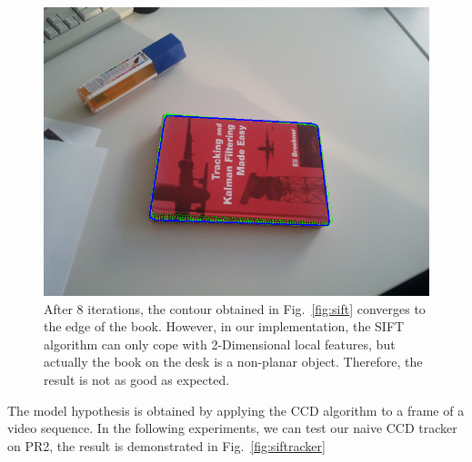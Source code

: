 \begin{figure}[htbp]
  \centering
\includegraphics[width=\linewidth]{images/sift_result.png}
\caption[The contour obtained using the CCD algorithm converges to the
edge of the book]{After 8 iterations, the contour obtained in Fig.~\ref{fig:sift} converges to the edge of the book. However, in our
  implementation, the SIFT algorithm can only cope with 2-Dimensional
  local features, but actually the book on the desk is a non-planar
  object. Therefore, the result is not as good as expected.}
\label{fig:sift_result}
\end{figure}

The model hypothesis is obtained by applying the CCD algorithm to a
frame of a video sequence. In the following experiments, we can test
our naive CCD tracker on PR2, the result is demonstrated in Fig.~\ref{fig:siftracker} 

